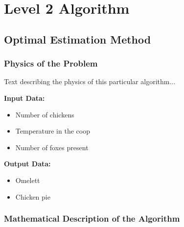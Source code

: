 \chapter{Level 2 Algorithm}
\label{chapter:L2algorithms}


\section{Optimal Estimation Method}

\subsection{Physics of the Problem}

Text describing the physics of this particular algorithm...

\textbf{ Input Data:}
\begin{itemize}
\item Number of chickens
\item Temperature in the coop
\item Number of foxes present
\end{itemize}


\textbf{Output Data:}
\begin{itemize}
\item Omelett
\item Chicken pie
\end{itemize}


\subsection{Mathematical Description of the Algorithm}


